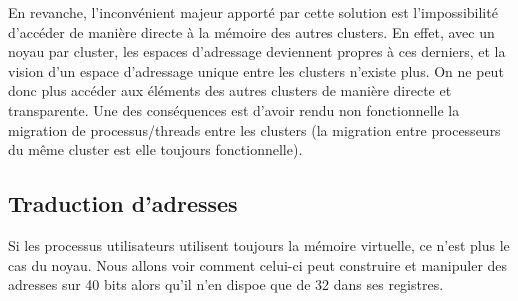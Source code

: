     En revanche, l'inconvénient majeur apporté par cette solution est
    l'impossibilité d'accéder de manière directe à la mémoire des autres
    clusters. En effet, avec un noyau par cluster, les espaces d'adressage
    deviennent propres à ces derniers, et la vision d'un espace d'adressage
    unique entre les clusters n'existe plus. On ne peut donc plus accéder aux
    éléments des autres clusters de manière directe et transparente. Une des
    conséquences est d'avoir rendu non fonctionnelle la migration de
    processus/threads entre les clusters (la migration entre processeurs du même
    cluster est elle toujours fonctionnelle).

    \subsection{Traduction d'adresses}

      Si les processus utilisateurs utilisent toujours la mémoire virtuelle, ce
      n'est plus le cas du noyau. Nous allons voir comment celui-ci peut
      construire et manipuler des adresses sur 40 bits alors qu'il n'en dispoe
      que de 32 dans ses registres.

